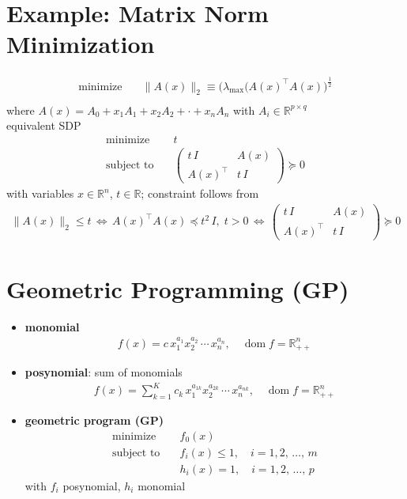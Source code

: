 \documentclass[11pt]{extarticle}
\newcommand{\ifff}{\,\Longleftrightarrow\,}
\DeclareMathOperator*{\dom}{dom}
\theoremstyle{definition}
\begin{document}
\section*{Example: Matrix Norm Minimization}
\begin{align*}
  \text{minimize}\quad & \|A(x)\|_2\equiv\big(\lambda_{\text{max}}(A(x)^\top A(x)\big)^{\frac{1}{2}} \\
\end{align*}
where $A(x) = A_0 + x_1 A_1 + x_2 A_2 + \cdot + x_n A_n$ with $A_i\in\mathbb{R}^{p\times q}$ \\
equivalent SDP
\begin{align*}
  \text{minimize}\quad & t \\
  \text{subject to}\quad & \begin{pmatrix} t\,I & A(x) \\ A(x)^\top & t\,I\end{pmatrix}\succcurlyeq 0
\end{align*}
with variables $x\in\mathbb{R}^n$, $t\in\mathbb{R}$; constraint follows from
\begin{align*}
  \|A(x)\|_2\leqslant t \ifff A(x)^\top A(x) \preccurlyeq t^2\,I,\; t > 0 \ifff \begin{pmatrix}t\,I & A(x) \\ A(x)^\top & t\,I\end{pmatrix}\succcurlyeq 0
\end{align*}

\newpage


\section*{Geometric Programming (GP)}

\begin{itemize}
  \item {\bf monomial}
    \begin{align*}
      f(x) = c\,x_1^{a_1}x_2^{a_2}\,\cdots\,x_n^{a_n}, \quad\dom f = \mathbb{R}^n_{++}
    \end{align*}
  \item {\bf posynomial}: sum of monomials
    \begin{align*}
      f(x) = \sum_{k = 1}^K c_k\,x_1^{a_{1k}}x_2^{a_{2k}}\,\cdots\, x_n^{a_{nk}}, \quad\dom f = \mathbb{R}^n_{++}
    \end{align*}
  \item {\bf geometric program (GP)}
    \begin{align*}
      \text{minimize}\quad & f_0(x) \\
      \text{subject to}\quad & f_i(x)\leqslant 1, \quad i = 1, 2,\,\ldots,\,m \\
      \qquad\qquad & h_i(x) = 1, \quad i = 1, 2,\,\ldots,\,p
    \end{align*}
    with $f_i$ posynomial, $h_i$ monomial
\end{itemize}
\end{document}
